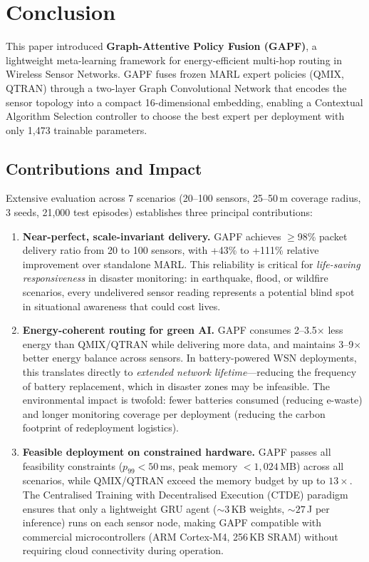 \documentclass[12pt, onecolumn, journal]{IEEEtran}
\begin{document}
\FloatBarrier



\section{Conclusion}
\label{sec:conclusion}

This paper introduced \textbf{Graph-Attentive Policy Fusion (GAPF)}, a lightweight meta-learning framework for energy-efficient multi-hop routing in Wireless Sensor Networks. GAPF fuses frozen MARL expert policies (QMIX, QTRAN) through a two-layer Graph Convolutional Network that encodes the sensor topology into a compact 16-dimensional embedding, enabling a Contextual Algorithm Selection controller to choose the best expert per deployment with only 1{,}473 trainable parameters.

\subsection{Contributions and Impact}

Extensive evaluation across 7 scenarios (20--100 sensors, 25--50\,m coverage radius, 3 seeds, 21{,}000 test episodes) establishes three principal contributions:

\begin{enumerate}
    \item \textbf{Near-perfect, scale-invariant delivery.} GAPF achieves $\geq$98\% packet delivery ratio from 20 to 100 sensors, with +43\% to +111\% relative improvement over standalone MARL. This reliability is critical for \emph{life-saving responsiveness} in disaster monitoring: in earthquake, flood, or wildfire scenarios, every undelivered sensor reading represents a potential blind spot in situational awareness that could cost lives.
    
    \item \textbf{Energy-coherent routing for green AI.} GAPF consumes 2--3.5$\times$ less energy than QMIX/QTRAN while delivering more data, and maintains 3--9$\times$ better energy balance across sensors. In battery-powered WSN deployments, this translates directly to \emph{extended network lifetime}---reducing the frequency of battery replacement, which in disaster zones may be infeasible. The environmental impact is twofold: fewer batteries consumed (reducing e-waste) and longer monitoring coverage per deployment (reducing the carbon footprint of redeployment logistics).
    
    \item \textbf{Feasible deployment on constrained hardware.} GAPF passes all feasibility constraints ($p_{99} < 50$\,ms, peak memory $< 1{,}024$\,MB) across all scenarios, while QMIX/QTRAN exceed the memory budget by up to $13\times$. The Centralised Training with Decentralised Execution (CTDE) paradigm ensures that only a lightweight GRU agent (${\sim}3$\,KB weights, ${\sim}27$\,\textmu J per inference) runs on each sensor node, making GAPF compatible with commercial microcontrollers (ARM Cortex-M4, 256\,KB SRAM) without requiring cloud connectivity during operation.
\end{enumerate}
\end{document}
